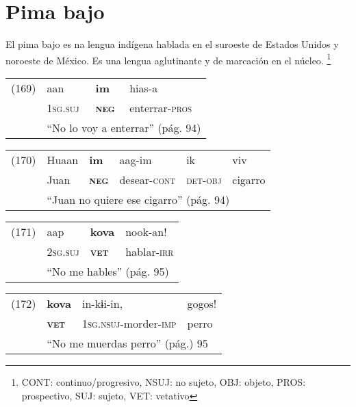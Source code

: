 \section*{Pima bajo}

\noindent El pima bajo es na lengua indígena hablada en el suroeste de Estados Unidos y noroeste de México. Es una lengua aglutinante y de marcación en el núcleo.
\footnote{CONT: continuo/progresivo, NSUJ: no sujeto, OBJ: objeto, PROS: prospectivo, SUJ: sujeto, VET: vetativo}
\vspace{0.5cm}

{\setmainfont{Charis SIL} 

\begin{tabular}{llll}
(169) & aan & \textbf{im} & hias-a \\
& \textsc{1sg.suj} & \textsc{\textbf{neg}} & enterrar-\textsc{pros} \\
& \multicolumn{3}{l}{``No lo voy a enterrar'' (pág. 94)}
\end{tabular} \vspace{0.5cm}

\begin{tabular}{llllll}
(170) & Huaan & \textbf{im} & aag-im & ik & viv \\
& Juan & \textsc{\textbf{neg}} & desear-\textsc{cont} & \textsc{det-obj} & cigarro \\
& \multicolumn{5}{l}{``Juan no quiere ese cigarro'' (pág. 94)}
\end{tabular} \vspace{0.5cm}

\begin{tabular}{llll}
(171) & aap & \textbf{kova} & nook-an! \\
& \textsc{2sg.suj} & \textsc{\textbf{vet}} & hablar-\textsc{irr} \\
& \multicolumn{3}{l}{``No me hables'' (pág. 95)}
\end{tabular} \vspace{0.5cm}

\begin{tabular}{llll}
(172) & \textbf{kova} & in-kɨi-in, & gogos!  \\
& \textsc{\textbf{vet}} & \textsc{1sg.nsuj-}morder-\textsc{imp} & perro \\
& \multicolumn{3}{l}{``No me muerdas perro'' (pág.) 95 }
\end{tabular} \vspace{0.5cm}

}

